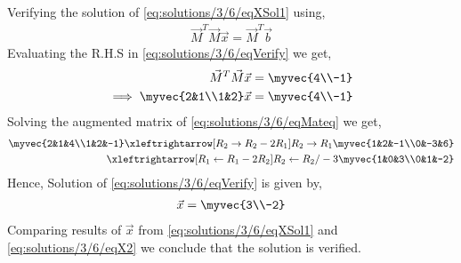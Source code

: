 Verifying the solution of \eqref{eq:solutions/3/6/eqXSol1} using,
\begin{align}
\vec{M}^T\vec{M}\vec{x} = \vec{M}^T\vec{b}\label{eq:solutions/3/6/eqVerify}
\end{align}
Evaluating the R.H.S in \eqref{eq:solutions/3/6/eqVerify} we get,
\begin{align}
\vec{M}^T\vec{M}\vec{x} &= \myvec{4\\-1}\\
\implies\myvec{2&1\\1&2}\vec{x} &= \myvec{4\\-1}\label{eq:solutions/3/6/eqMateq}
\end{align}
Solving the augmented matrix of \eqref{eq:solutions/3/6/eqMateq} we get,
\begin{align}
\myvec{2&1&4\\1&2&-1}\xleftrightarrow[R_2\rightarrow{R_2-2R_1}]{R_2\rightarrow{R_1}}\myvec{1&2&-1\\0&-3&6}\\\xleftrightarrow[R_1\leftarrow{R_1-2R_2}]{R_2\leftarrow{R_2/-3}}\myvec{1&0&3\\0&1&-2}
\end{align}
Hence, Solution of \eqref{eq:solutions/3/6/eqVerify} is given by,
\begin{align}
\vec{x}=\myvec{3\\-2}\label{eq:solutions/3/6/eqX2}
\end{align}
Comparing results of $\vec{x}$ from \eqref{eq:solutions/3/6/eqXSol1} and \eqref{eq:solutions/3/6/eqX2} we conclude that the solution is verified.


